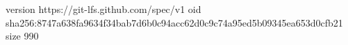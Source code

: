 version https://git-lfs.github.com/spec/v1
oid sha256:8747a638fa9634f34bab7d6b0c94acc62d0c9c74a95ed5b09345ea653d0cfb21
size 990
